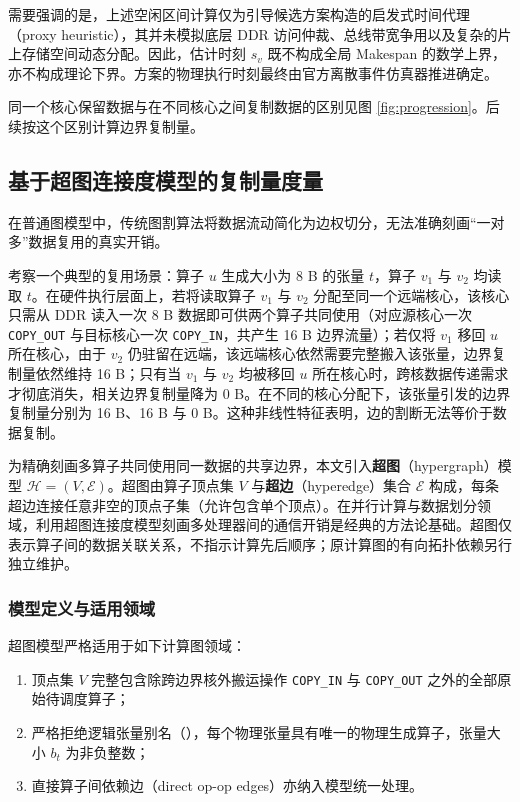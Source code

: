 \documentclass[anonymous,notoc]{gmcm2026}
\providecommand{\tightlist}{\setlength{\itemsep}{0pt}\setlength{\parskip}{0pt}}
\begin{document}
需要强调的是，上述空闲区间计算仅为引导候选方案构造的启发式时间代理（proxy heuristic），其并未模拟底层 DDR 访问仲裁、总线带宽争用以及复杂的片上存储空间动态分配。因此，估计时刻 \(s_v\) 既不构成全局 Makespan 的数学上界，亦不构成理论下界。方案的物理执行时刻最终由官方离散事件仿真器推进确定。

同一个核心保留数据与在不同核心之间复制数据的区别见图 \ref{fig:progression}。后续按这个区别计算边界复制量。

\subsection{基于超图连接度模型的复制量度量}

在普通图模型中，传统图割算法将数据流动简化为边权切分，无法准确刻画``一对多''数据复用的真实开销。

考察一个典型的复用场景：算子 \(u\) 生成大小为 8 B 的张量 \(t\)，算子 \(v_1\) 与 \(v_2\) 均读取 \(t\)。在硬件执行层面上，若将读取算子 \(v_1\) 与 \(v_2\) 分配至同一个远端核心，该核心只需从 DDR 读入一次 8 B 数据即可供两个算子共同使用（对应源核心一次 \texttt{COPY\_OUT} 与目标核心一次 \texttt{COPY\_IN}，共产生 16 B 边界流量）；若仅将 \(v_1\) 移回 \(u\) 所在核心，由于 \(v_2\) 仍驻留在远端，该远端核心依然需要完整搬入该张量，边界复制量依然维持 16 B；只有当 \(v_1\) 与 \(v_2\) 均被移回 \(u\) 所在核心时，跨核数据传递需求才彻底消失，相关边界复制量降为 0 B。在不同的核心分配下，该张量引发的边界复制量分别为 16 B、16 B 与 0 B。这种非线性特征表明，边的割断无法等价于数据复制。

为精确刻画多算子共同使用同一数据的共享边界，本文引入\textbf{超图}（hypergraph）模型 \(\mathcal{H} = (V, \mathcal{E})\)。超图由算子顶点集 \(V\) 与\textbf{超边}（hyperedge）集合 \(\mathcal{E}\) 构成，每条超边连接任意非空的顶点子集（允许包含单个顶点）\cite{ref5}。在并行计算与数据划分领域，利用超图连接度模型刻画多处理器间的通信开销是经典的方法论基础\cite{ref3}。超图仅表示算子间的数据关联关系，不指示计算先后顺序；原计算图的有向拓扑依赖另行独立维护。

\subsubsection{模型定义与适用领域}

超图模型严格适用于如下计算图领域：

\begin{enumerate}
\def\labelenumi{\arabic{enumi}.}
\tightlist
\item
  顶点集 \(V\) 完整包含除跨边界核外搬运操作 \texttt{COPY\_IN} 与 \texttt{COPY\_OUT} 之外的全部原始待调度算子；
\item
  严格拒绝逻辑张量别名（\texttt{}），每个物理张量具有唯一的物理生成算子，张量大小 \(b_t\) 为非负整数；
\item
  直接算子间依赖边（direct op-op edges）亦纳入模型统一处理。
\end{enumerate}
\end{document}
